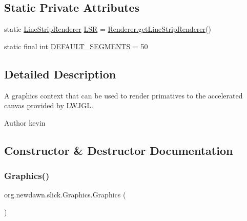 \subsection*{Static Private Attributes}
\begin{DoxyCompactItemize}
\item 
static \mbox{\hyperlink{interfaceorg_1_1newdawn_1_1slick_1_1opengl_1_1renderer_1_1_line_strip_renderer}{Line\+Strip\+Renderer}} \mbox{\hyperlink{classorg_1_1newdawn_1_1slick_1_1_graphics_a56cf9873aa4a26e824f6cd4232fdb3f0}{L\+SR}} = \mbox{\hyperlink{classorg_1_1newdawn_1_1slick_1_1opengl_1_1renderer_1_1_renderer_a8e231c62dce8d884fd0b26beed63e743}{Renderer.\+get\+Line\+Strip\+Renderer}}()
\item 
static final int \mbox{\hyperlink{classorg_1_1newdawn_1_1slick_1_1_graphics_a523bc56e4f87dbc577db200399909f6d}{D\+E\+F\+A\+U\+L\+T\+\_\+\+S\+E\+G\+M\+E\+N\+TS}} = 50
\end{DoxyCompactItemize}


\subsection{Detailed Description}
A graphics context that can be used to render primatives to the accelerated canvas provided by L\+W\+J\+GL.

\begin{DoxyAuthor}{Author}
kevin 
\end{DoxyAuthor}


\subsection{Constructor \& Destructor Documentation}
\mbox{\label{classorg_1_1newdawn_1_1slick_1_1_graphics_ab4edacd00331d6232b2b2ab72ee9600a}} 
\subsubsection{\texorpdfstring{Graphics()}{Graphics()}\hspace{0.1cm}{\footnotesize\ttfamily [1/2]}}
{\footnotesize\ttfamily org.\+newdawn.\+slick.\+Graphics.\+Graphics (\begin{DoxyParamCaption}{ }\end{DoxyParamCaption})\hspace{0.3cm}{\ttfamily [inline]}}

